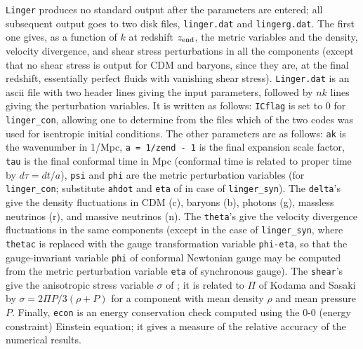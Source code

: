 {\tt Linger} produces no standard output after the parameters are
entered; all subsequent output goes to two disk files, {\tt linger.dat}
and {\tt lingerg.dat}.  The first one gives, as a function of $k$ at
redshift $z_{\rm end}$, the metric variables and the density, velocity
divergence, and shear stress perturbations in all the components (except
that no shear stress is output for CDM and baryons, since they are, at the
final redshift, essentially perfect fluids with vanishing shear stress).
{\tt Linger.dat} is an ascii file with two header lines giving the input
parameters, followed by $nk$ lines giving the perturbation variables.
It is written as follows:
\hfil{}
{\tt ICflag} is set to 0 for {\tt linger\_con}, allowing one to determine
from the files which of the two codes was used for isentropic initial
conditions.  The other parameters are as follows:
{\tt ak} is the wavenumber in 1/Mpc, {\tt a = 1/zend - 1} is the
final expansion scale factor, {\tt tau} is the final conformal time in Mpc
(conformal time is related to proper time by $d\tau=dt/a$), {\tt psi} and
{\tt phi} are the metric perturbation variables (for {\tt linger\_con};
substitute {\tt ahdot} and {\tt eta} of \cite{mab1} in case of
{\tt linger\_syn}).  The {\tt delta}'s give the density fluctuations in
CDM (c), baryons (b), photons (g), massless neutrinos (r), and massive
neutrinos (n).  The {\tt theta}'s give the velocity divergence fluctuations
in the same components (except in the case of {\tt linger\_syn}, where
{\tt thetac} is replaced with the gauge transformation variable
{\tt phi-eta}, so that the gauge-invariant variable {\tt phi} of
conformal Newtonian gauge may be computed from the metric perturbation
variable {\tt eta} of synchronous gauge).  The {\tt shear}'s give the
anisotropic stress variable $\sigma$ of \cite{mab1}; it is related to
$\Pi$ of Kodama and Sasaki \cite{ks1} by $\sigma=2\Pi P/3(\rho+P)$ for
a component with mean density $\rho$ and mean pressure $P$.  Finally,
{\tt econ} is an energy conservation check computed using the 0-0
(energy constraint) Einstein equation; it gives a measure of the relative
accuracy of the numerical results.

